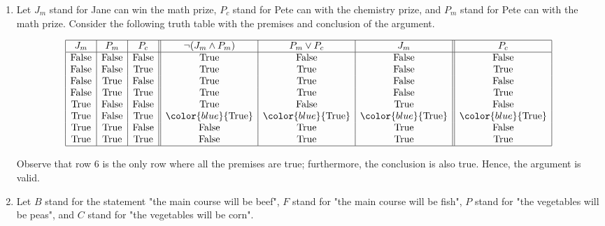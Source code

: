 \begin{enumerate}[label=(\alph*)]
    \item Let $J_m$ stand for Jane can win the math prize, $P_c$ stand for Pete can with the chemistry prize, and $P_m$ stand for Pete can with the math prize. Consider the following truth table with the premises and conclusion of the argument.

    \[
    \begin{array}{|c|c|c||c|c|c||c|}
    \hline
    J_m & P_m & P_c & \neg (J_m \wedge P_m) & P_m \vee P_c & J_m & P_c \\
    \hline
    \text{False} & \text{False} & \text{False} & \text{True} & \text{False} & \text{False} & \text{False} \\
    \text{False} & \text{False} & \text{True} & \text{True} & \text{True} & \text{False} & \text{True} \\
    \text{False} & \text{True} & \text{False} & \text{True} & \text{True} & \text{False} & \text{False} \\
    \text{False} & \text{True} & \text{True} & \text{True} & \text{True} & \text{False} & \text{True} \\
    \text{True} & \text{False} & \text{False} & \text{True} & \text{False} & \text{True} & \text{False} \\
    \text{True} & \text{False} & \text{True} & \color{blue}{\text{True}} & \color{blue}{\text{True}} & \color{blue}{\text{True}} & \color{blue}{\text{True}} \\
    \text{True} & \text{True} & \text{False} & \text{False} & \text{True} & \text{True} & \text{False} \\
    \text{True} & \text{True} & \text{True} & \text{False} & \text{True} & \text{True} & \text{True} \\
    \hline
    \end{array}
    \]

    Observe that row 6 is the only row where all the premises are true; furthermore, the conclusion is also true. Hence, the argument is valid.

\pagebreak

    \item Let $B$ stand for the statement "the main course will be beef", $F$ stand for "the main course will be fish", $P$ stand for "the vegetables will be peas", and $C$ stand for "the vegetables will be corn".


\end{enumerate}
